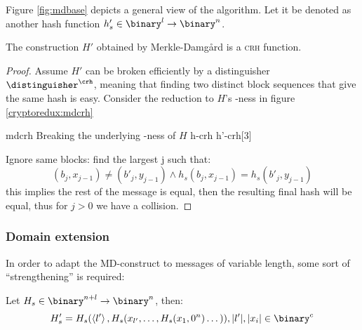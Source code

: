 Figure \ref{fig:mdbase} depicts a general view of the algorithm. Let it be denoted as another hash function $h'_s \in \binary^l \to \binary^n$.

\begin{theorem}
    The construction $H'$ obtained by Merkle-Damg\r{a}rd is a \textsc{crh} function.
\end{theorem}

\begin{proof}
    Assume $H'$ can be broken efficiently by a distinguisher $\distinguisher^{\crh}$, meaning that finding two distinct block sequences that give the same hash is easy. Consider the reduction to $H$'s \crh-ness in figure \ref{cryptoredux:mdcrh}

    \begin{cryptoredux}
        {mdcrh}
        {Breaking the underlying \crh-ness of $H$}
        {h-crh}
        {h'-crh}[3]


        \cseqdelay


    \end{cryptoredux}

    Ignore same blocks: find the largest j such that:
    \[
        (b_j, x_{j - 1}) \neq (b'_j, y_{j - 1}) \wedge h_s(b_j, x_{j - 1}) = h_s(b'_j, y_{j - 1})
    \]
    this implies the rest of the message is equal, then the resulting final hash will be equal, thus for $j > 0$ we have a collision.

\end{proof}

\subsubsection{Domain extension}

In order to adapt the MD-construct to messages of variable length, some sort of ``strengthening'' is required: 

\begin{lemma}
    Let $H_s \in \binary^{n + l} \to \binary^n$, then:
    \[
        H'_s = H_s(\left<l'\right>, H_s(x_{l'}, \dots , H_s(x_1, 0^n) \dots)), |l'|, |x_i| \in \binary^c 
    \]
\end{lemma}

